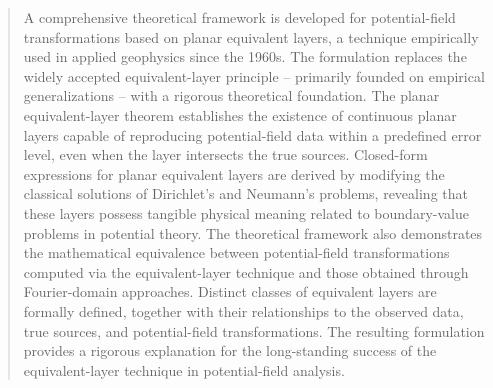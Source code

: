 \begin{abstract}
	A comprehensive theoretical framework is developed for potential-field transformations 
	based on planar equivalent layers, a technique empirically used in applied geophysics since 
	the 1960s. The formulation replaces the widely accepted equivalent-layer principle -- primarily 
	founded on empirical generalizations -- with a rigorous theoretical foundation. The planar 
	equivalent-layer theorem establishes the existence of continuous planar layers capable of 
	reproducing potential-field data within a predefined error level, even when the layer 
	intersects the true sources. Closed-form expressions for planar equivalent layers are derived 
	by modifying the classical solutions of Dirichlet’s and Neumann’s problems, revealing that 
	these layers possess tangible physical meaning related to boundary-value problems in potential 
	theory. The theoretical framework also demonstrates the mathematical equivalence between 
	potential-field transformations computed via the equivalent-layer technique and those obtained 
	through Fourier-domain approaches. Distinct classes of equivalent layers are formally defined, 
	together with their relationships to the observed data, true sources, and potential-field 
	transformations. The resulting formulation provides a rigorous explanation for the 
	long-standing success of the equivalent-layer technique in potential-field analysis.
\end{abstract}